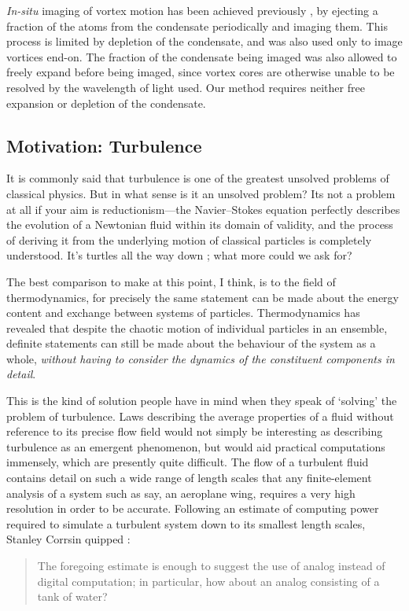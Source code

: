 \emph{In-situ} imaging of vortex motion has been achieved previously \cite{freilich_real-time_2010}, by ejecting a fraction of the atoms from the condensate periodically and imaging them. This process is limited by depletion of the condensate, and was also used only to image vortices end-on. The fraction of the condensate being imaged was also allowed to freely expand before being imaged, since vortex cores are otherwise unable to be resolved by the wavelength of light used. Our method requires neither free expansion or depletion of the condensate.

\subsection{Motivation: Turbulence}

It is commonly said that turbulence is one of the greatest unsolved problems of classical physics. But in what sense is it an unsolved problem? Its not a problem at all if your aim is reductionism---the Navier--Stokes equation perfectly describes the evolution of a Newtonian fluid within its domain of validity, and the process of deriving it from the underlying motion of classical particles is completely understood. It's turtles all the way down \cite[p 1]{hawking_brief_1988}; what more could we ask for?

The best comparison to make at this point, I think, is to the field of thermodynamics, for precisely the same statement can be made about the energy content and exchange between systems of particles. Thermodynamics has revealed that despite the chaotic motion of individual particles in an ensemble, definite statements can still be made about the behaviour of the system as a whole, \emph{without having to consider the dynamics of the constituent components in detail}.

This is the kind of solution people have in mind when they speak of `solving' the problem of turbulence. Laws describing the average properties of a fluid without reference to its precise flow field would not simply be interesting as describing turbulence as an emergent phenomenon, but would aid practical computations immensely, which are presently quite difficult. The flow of a turbulent fluid contains detail on such a  wide range of length scales that any finite-element analysis of a system such as say, an aeroplane wing, requires a very high resolution in order to be accurate. Following an estimate of computing power required to simulate a turbulent system down to its smallest length scales, Stanley Corrsin quipped \cite{corrsin_turbulent_1961}:
\begin{quote}
The foregoing estimate  is enough to suggest the use of analog instead of digital  computation; in particular, how about an analog consisting of a tank of water?
\end{quote}

